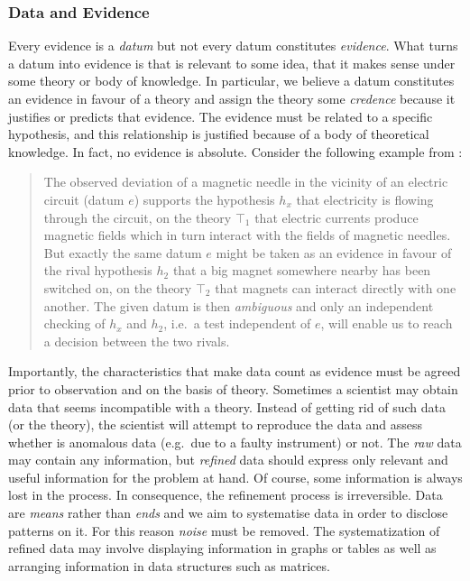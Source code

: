 \documentclass[
]{book}
\begin{document}
\hypertarget{data-and-evidence}{%
\subsubsection{Data and Evidence}\label{data-and-evidence}}

Every evidence is a \emph{datum} but not every datum constitutes \emph{evidence}. What turns a datum into evidence is that is relevant to some idea, that it makes sense under some theory or body of knowledge. In particular, we believe a datum constitutes an evidence in favour of a theory and assign the theory some \emph{credence} because it justifies or predicts that evidence. The evidence must be related to a specific hypothesis, and this relationship is justified because of a body of theoretical knowledge. In fact, no evidence is absolute. Consider the following example from \citep{bunge2017philosophy}:

\begin{quote}
The observed deviation of a magnetic needle in the vicinity of an electric circuit (datum \(e\)) supports the hypothesis \(h_x\) that electricity is flowing through the circuit, on the theory \(⊤_1\) that electric currents produce magnetic fields which in turn interact with the fields of magnetic needles. But exactly the same datum \(e\) might be taken as an evidence in favour of the rival hypothesis \(h_2\) that a big magnet somewhere nearby has been switched on, on the theory \(⊤_2\) that magnets can interact directly with one another. The given datum is then \emph{ambiguous} and only an independent checking of \(h_x\) and \(h_2\), i.e.~a test independent of \(e\), will enable us to reach a decision between the two rivals.
\end{quote}

Importantly, the characteristics that make data count as evidence must be agreed prior to observation and on the basis of theory. Sometimes a scientist may obtain data that seems incompatible with a theory. Instead of getting rid of such data (or the theory), the scientist will attempt to reproduce the data and assess whether is anomalous data (e.g.~due to a faulty instrument) or not. The \emph{raw} data may contain any information, but \emph{refined} data should express only relevant and useful information for the problem at hand. Of course, some information is always lost in the process. In consequence, the refinement process is irreversible. Data are \emph{means} rather than \emph{ends} and we aim to systematise data in order to disclose patterns on it. For this reason \emph{noise} must be removed. The systematization of refined data may involve displaying information in graphs or tables as well as arranging information in data structures such as matrices.
\end{document}
